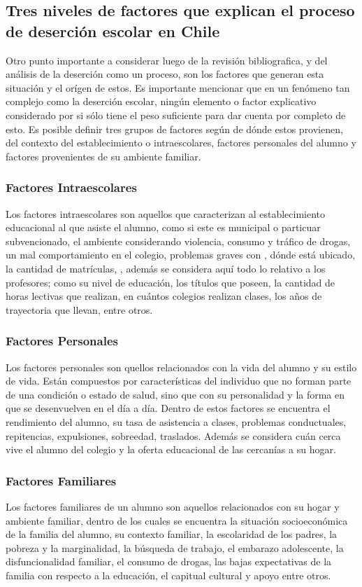 \subsection{Tres niveles de factores que explican el proceso de deserción escolar en Chile}
Otro punto importante a considerar luego de la revisión bibliografica, y del análisis de la deserción como un proceso, son los factores que generan esta situación y el orígen de estos. Es importante mencionar que en un fenómeno tan complejo como la deserción escolar, ningún elemento o factor explicativo considerado por si sólo tiene el peso suficiente para dar cuenta por completo de esto. 
Es posible definir tres grupos de factores según de dónde estos provienen, del contexto del establecimiento o intraescolares, factores personales del alumno y factores provenientes de su ambiente familiar. 
\subsubsection{Factores Intraescolares}
Los factores intraescolares son aquellos que caracterizan al establecimiento educacional al que asiste el alumno, como si este es municipal o particuar subvencionado, el ambiente considerando violencia, consumo y tráfico de drogas, un mal comportamiento en el colegio,  problemas graves con , dónde está ubicado, la cantidad de matrículas, , además se considera aquí todo lo relativo a los profesores; como su nivel de educación, los títulos que poseen, la cantidad de horas lectivas que realizan, en cuántos colegios realizan clases, los años de trayectoria que llevan, entre otros. 
\subsubsection{Factores Personales}
Los factores personales son quellos relacionados con la vida del alumno y su estilo de vida. Están compuestos por características del individuo que no forman parte de una condición o estado de salud, sino que con su personalidad y la forma en que se desenvuelven en el día a día. 
Dentro de estos factores se encuentra el rendimiento del alumno, su tasa de asistencia a clases, problemas conductuales, repitencias, expulsiones, sobreedad, traslados. Además se considera cuán cerca vive el alumno del colegio y la oferta educacional de las cercanías a su hogar. 
\subsubsection{Factores Familiares}
Los factores familiares de un alumno son aquellos relacionados con su hogar y ambiente familiar, dentro de los cuales se encuentra la situación socioeconómica de la familia del alumno, su contexto familiar, la escolaridad de los padres, la pobreza y la marginalidad, la búsqueda de trabajo, el embarazo adolescente, la disfuncionalidad familiar, el consumo de drogas, las bajas expectativas de la familia con respecto a la educación, el capitual cultural y apoyo entre otros.


